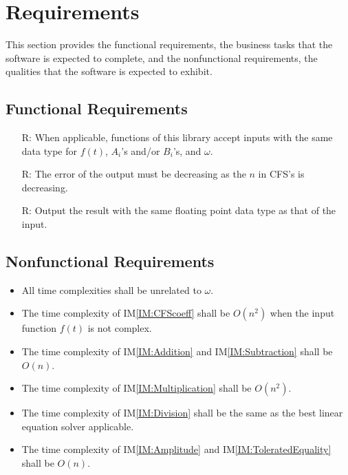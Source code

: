 \documentclass[12pt]{article}
\newcommand{\iref}[1]{IM\ref{#1}}
\newcounter{reqnum} %
\begin{document}
\section{Requirements}\label{Sc:Req}

This section provides the functional requirements, the business tasks that the
software is expected to complete, and the nonfunctional requirements, the
qualities that the software is expected to exhibit.

\subsection{Functional Requirements}

\noindent \begin{itemize}

\item[R\refstepcounter{reqnum}\thereqnum \label{R:InputDataType}:] 
When applicable, functions of this library accept inputs with the same 
data type for $f(t)$, $A_i$'s and/or $B_i$'s, and $\omega$. 
\item[R\refstepcounter{reqnum}\thereqnum \label{R:OutputError}:] 
The error of the output must be decreasing as the $n$ in CFS's is decreasing.
\item[R\refstepcounter{reqnum}\thereqnum \label{R:OutputDataType}:] 
Output the result with the same floating point data type as that of the input.
\end{itemize}

\subsection{Nonfunctional Requirements}

\begin{itemize}
	\item All time complexities shall be unrelated to $\omega$.
	\item The time complexity of \iref{IM:CFScoeff} shall be $O(n^2)$ 
	when the input function $f(t)$ is not complex.
	\item The time complexity of \iref{IM:Addition} and \iref{IM:Subtraction} 
	shall be $O(n)$.
	\item The time complexity of \iref{IM:Multiplication} shall be $O(n^2)$.
	\item The time complexity of \iref{IM:Division} shall be the same 
	as the best linear equation solver applicable.
	\item The time complexity of \iref{IM:Amplitude} 
	and \iref{IM:ToleratedEquality} shall be $O(n)$.
\end{itemize}
\end{document}
